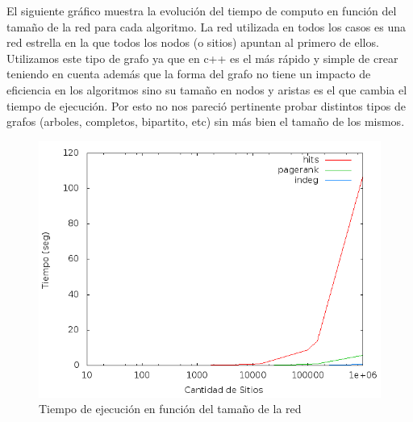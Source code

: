 El siguiente gráfico muestra la evolución del tiempo de computo en función del tamaño de la red para cada algoritmo. La red utilizada en todos los casos es una red estrella en la que todos los nodos (o sitios) apuntan al primero de ellos. Utilizamos este tipo de grafo ya que en c++ es el más rápido y simple de crear teniendo en cuenta además que la forma del grafo no tiene un impacto de eficiencia en los algoritmos sino su tamaño en nodos y aristas es el que cambia el tiempo de ejecución. Por esto no nos pareció pertinente probar distintos tipos de grafos (arboles, completos, bipartito, etc) sin más bien el tamaño de los mismos.

 \begin{figure}[!htb]
\begin{center}
    \includegraphics[scale=0.5]{imagenes/Tiempos.png}
    \caption{Tiempo de ejecución en función del tamaño de la red}
    \end{center}
\end{figure}

